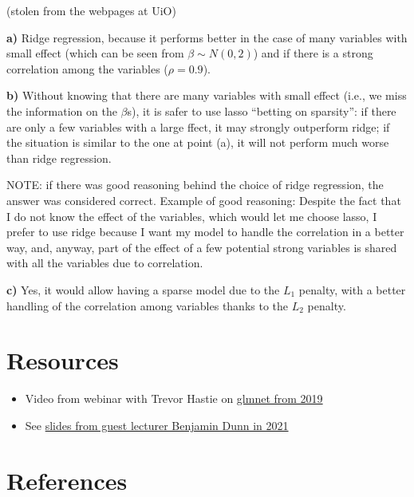 \documentclass[
  letterpaper,
  DIV=11,
  numbers=noendperiod]{scrartcl}
\providecommand{\tightlist}{%
  \setlength{\itemsep}{0pt}\setlength{\parskip}{0pt}}\usepackage{longtable,booktabs,array}
\begin{document}
(stolen from the webpages at UiO)

\textbf{a) } Ridge regression, because it performs better in the case of
many variables with small effect (which can be seen from
\(\beta \sim N(0,2)\)) and if there is a strong correlation among the
variables (\(\rho=0.9\)).

\textbf{b)} Without knowing that there are many variables with small
effect (i.e., we miss the information on the \(\beta\)s), it is safer to
use lasso ``betting on sparsity'': if there are only a few variables
with a large ffect, it may strongly outperform ridge; if the situation
is similar to the one at point (a), it will not perform much worse than
ridge regression.

NOTE: if there was good reasoning behind the choice of ridge regression,
the answer was considered correct. Example of good reasoning: Despite
the fact that I do not know the effect of the variables, which would let
me choose lasso, I prefer to use ridge because I want my model to handle
the correlation in a better way, and, anyway, part of the effect of a
few potential strong variables is shared with all the variables due to
correlation.

\textbf{c)} Yes, it would allow having a sparse model due to the \(L_1\)
penalty, with a better handling of the correlation among variables
thanks to the \(L_2\) penalty.

\hypertarget{resources}{%
\section{Resources}\label{resources}}

\begin{itemize}
\tightlist
\item
  Video from webinar with Trevor Hastie on
  \href{http://youtu.be/BU2gjoLPfDc}{glmnet from 2019}
\item
  See
  \href{https://github.com/mettelang/MA8701V2021/blob/main/Part1/LassoandfriendsBenDunn.pdf}{slides
  from guest lecturer Benjamin Dunn in 2021}
\end{itemize}

\hypertarget{references}{%
\section{References}\label{references}}
\end{document}
